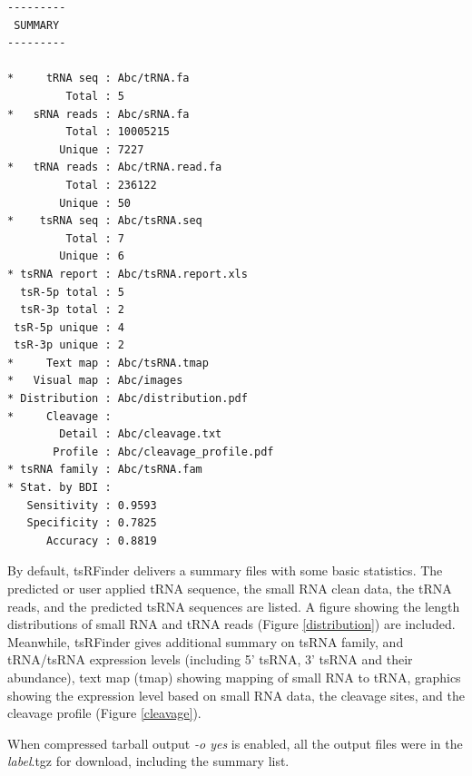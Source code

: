 \documentclass[11pt, a4paper]{article}
\begin{document}
{\footnotesize \begin{tcolorbox}[colback=blue!5!white,colframe=pink!75!black,title=tsRFinder demo output list]
\begin{verbatim}
---------
 SUMMARY 
---------

*     tRNA seq : Abc/tRNA.fa
         Total : 5
*   sRNA reads : Abc/sRNA.fa
         Total : 10005215
        Unique : 7227
*   tRNA reads : Abc/tRNA.read.fa
         Total : 236122
        Unique : 50
*    tsRNA seq : Abc/tsRNA.seq
         Total : 7
        Unique : 6
* tsRNA report : Abc/tsRNA.report.xls
  tsR-5p total : 5
  tsR-3p total : 2
 tsR-5p unique : 4
 tsR-3p unique : 2
*     Text map : Abc/tsRNA.tmap
*   Visual map : Abc/images
* Distribution : Abc/distribution.pdf
*     Cleavage :
        Detail : Abc/cleavage.txt
       Profile : Abc/cleavage_profile.pdf
* tsRNA family : Abc/tsRNA.fam
* Stat. by BDI :
   Sensitivity : 0.9593
   Specificity : 0.7825
      Accuracy : 0.8819
\end{verbatim}
\end{tcolorbox}}

By default, tsRFinder delivers a summary files with some basic statistics. The predicted or user applied tRNA sequence, the small RNA clean data, the tRNA reads, and the predicted tsRNA sequences are listed. A figure showing the length distributions of small RNA and tRNA reads (Figure \ref{distribution}) are included. Meanwhile, tsRFinder gives additional summary on tsRNA family, and tRNA/tsRNA expression levels (including 5' tsRNA, 3' tsRNA and their abundance), text map (tmap) showing mapping of small RNA to tRNA, graphics showing the expression level based on small RNA data, the cleavage sites, and the cleavage profile (Figure \ref{cleavage}).

When compressed tarball output \emph{-o yes} is enabled, all the output files were in the \emph{label}.tgz for download, including the summary list.
\end{document}
